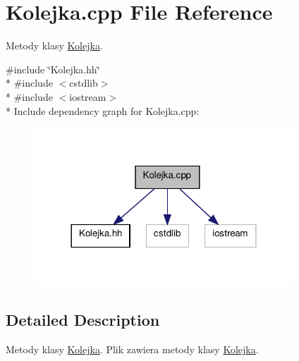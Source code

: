 \hypertarget{a00007}{\section{Kolejka.\-cpp File Reference}
\label{a00007}
}


Metody klasy \hyperlink{a00002}{Kolejka}.  


{\ttfamily \#include \char`\"{}Kolejka.\-hh\char`\"{}}\\*
{\ttfamily \#include $<$cstdlib$>$}\\*
{\ttfamily \#include $<$iostream$>$}\\*
Include dependency graph for Kolejka.\-cpp\-:\nopagebreak
\begin{figure}[H]
\begin{center}
\leavevmode
\includegraphics[width=276pt]{a00018}
\end{center}
\end{figure}


\subsection{Detailed Description}
Metody klasy \hyperlink{a00002}{Kolejka}. Plik zawiera metody klasy \hyperlink{a00002}{Kolejka}. 